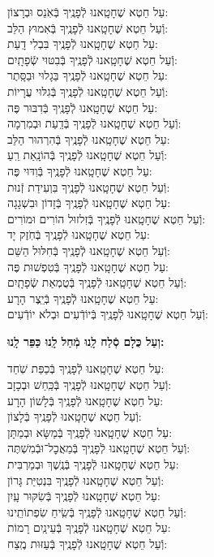\documentclass[twoside, openany, parskip=half, 11pt]{book}
\begin{document}
\begin{sometimes}
עַל חֵטְא שֶׁחָטָֽאנוּ לְֿפָנֶֽיךָ בְּֿאֹֽנֵס וּבְרָצוֹן:\\ וְֿעַל חֵטְא שֶׁחָטָֽאנוּ לְֿפָנֶֽיךָ בְּֿאִמוּץ הַלֵּב: \\
עַל חֵטְא שֶׁחָטָֽאנוּ לְֿפָנֶֽיךָ בִּבְלִי דָֽעַת: \\ וְֿעַל חֵטְא שֶׁחָטָֽאנוּ לְֿפָנֶֽיךָ בְּֿבִטּוּי שְֿׂפָתָֽיִם:\\
עַל חֵטְא שֶׁחָטָֽאנוּ לְֿפָנֶֽיךָ בַּגָלוּי וּבַסָּֽתֶר: \\ וְֿעַל חֵטְא שֶׁחָטָֽאנוּ לְֿפָנֶֽיךָ בְּֿגִלּוּי עֲרָיוֹת: \\
עַל חֵטְא שֶׁחָטָֽאנוּ לְֿפָנֶֽיךָ בְּֿדִבּוּר פֶּה: \\ וְֿעַל חֵטְא שֶׁחָטָֽאנוּ לְֿפָנֶֽיךָ בְּֿדַֽעַת וּבְמִרְמָה: \\
עַל חֵטְא שֶׁחָטָֽאנוּ לְֿפָנֶֽיךָ בְּֿהִרְהוּר הַלֵּב: \\ וְֿעַל חֵטְא שֶׁחָטָֽאנוּ לְֿפָנֶֽיךָ בְּֿהוֹנָֽאַת רֵֽעַ: \\
עַל חֵטְא שֶׁחָטָֽאנוּ לְֿפָנֶֽיךָ בְּֿוִדּוּי פֶּה:\\ וְֿעַל חֵטְא שֶׁחָטָֽאנוּ לְֿפָנֶֽיךָ בִּוְעִידַת זְֿנוּת: \\
עַל חֵטְא שֶׁחָטָֽאנוּ לְֿפָנֶֽיךָ בְּֿזָדוֹן וּבִשְׁגָגָה: \\ וְֿעַל חֵטְא שֶׁחָטָֽאנוּ לְֿפָנֶֽיךָ בְּֿזִלזוּל הוֹרִים וּמוֹרִים:\\
עַל חֵטְא שֶׁחָטָֽאנוּ לְֿפָנֶֽיךָ בְּֿחֹֽזֶק יָד: \\ וְֿעַל חֵטְא שֶׁחָטָֽאנוּ לְֿפָנֶֽיךָ בְּֿחִלּוּל הַשֵּׁם: \\
עַל חֵטְא שֶׁחָטָֽאנוּ לְֿפָנֶֽיךָ בְּֿטִפְשׁוּת פֶּה: \\ וְֿעַל חֵטְא שֶׁחָטָֽאנוּ לְֿפָנֶֽיךָ בְּֿטֻמְאַת שְֿׂפָתָֽיִם: \\
עַל חֵטְא שֶׁחָטָֽאנוּ לְֿפָנֶֽיךָ בְּֿיֵֽצֶר הָרָע: \\ וְֿעַל חֵטְא שֶׁחָטָֽאנוּ לְֿפָנֶֽיךָ בְּֿיוֹדְֿעִים וּבְלֹא יוֹדְֿעִים:

\textbf{וְעַל כֻּלָם סְֿלַח לָֽנוּ מְֿחַל לָֽנוּ כַּפֵּר לָֽנוּ:}

עַל חֵטְא שֶׁחָטָֽאנוּ לְֿפָנֶֽיךָ בְּֿכַפַּת שֹֽׁחַד: \\ וְֿעַל חֵטְא שֶׁחָטָֽאנוּ לְֿפָנֶֽיךָ בְּֿכַּֽחַשׁ וּבְכָזָב: \\
עַל חֵטְא שֶׁחָטָֽאנוּ לְֿפָנֶֽיךָ בְּֿלָשׁוֹן הָרָע:\\ וְֿעַל חֵטְא שֶׁחָטָֽאנוּ לְֿפָנֶֽיךָ בְּֿלָצוֹן:\\
עַל חֵטְא שֶׁחָטָֽאנוּ לְֿפָנֶֽיךָ בְּֿמַשָּׂא וּבְמַתָּן: \\ וְֿעַל חֵטְא שֶׁחָטָֽאנוּ לְֿפָנֶֽיךָ בְּֿמַאֲכׇל־וּבְֿמִשְׁתֶּה:\\
עַל חֵטְא שֶׁחָטָֽאנוּ לְֿפָנֶֽיךָ בְּֿנֶֽשֶׁךְ וּבְמַרְבִּית:\\ וְֿעַל חֵטְא שֶׁחָטָֽאנוּ לְֿפָנֶֽיךָ בִּנְטִיַּת גָּרוֹן: \\
עַל חֵטְא שֶׁחָטָֽאנוּ לְֿפָנֶֽיךָ בְּֿשִׂקּוּר עָֽיִן:\\ וְֿעַל חֵטְא שֶׁחָטָֽאנוּ לְֿפָנֶֽיךָ בְּֿשִֽׂיחַ שִׂפְתוֹתֵֽינוּ: \\
עַל חֵטְא שֶׁחָטָֽאנוּ לְֿפָנֶֽיךָ בְּֿעֵינַֽיִם רָמוֹת:\\ וְֿעַל חֵטְא שֶׁחָטָֽאנוּ לְֿפָנֶֽיךָ בְּֿעַזּוּת מֶֽצַח:


\end{sometimes}
\end{document}
